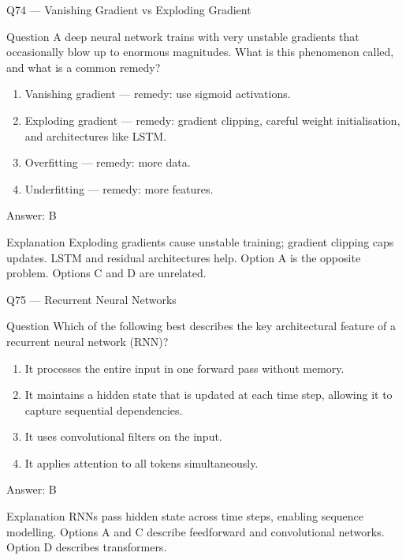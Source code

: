 \documentclass[aspectratio=169,8pt]{beamer}
\begin{document}
	\begin{frame}{Q74 --- Vanishing Gradient vs Exploding Gradient}
		\begin{block}{Question}
			A deep neural network trains with very unstable gradients that occasionally blow up to enormous magnitudes. What is this phenomenon called, and what is a common remedy?
		\end{block}
		\begin{enumerate}
			\item Vanishing gradient --- remedy: use sigmoid activations.
			\item Exploding gradient --- remedy: gradient clipping, careful weight initialisation, and architectures like LSTM.
			\item Overfitting --- remedy: more data.
			\item Underfitting --- remedy: more features.
		\end{enumerate}
		\begin{exampleblock}{Answer: B}\end{exampleblock}
		\begin{block}{Explanation}
			Exploding gradients cause unstable training; gradient clipping caps updates. LSTM and residual architectures help. Option A is the opposite problem. Options C and D are unrelated.
		\end{block}
	\end{frame}
	
	\begin{frame}{Q75 --- Recurrent Neural Networks}
		\begin{block}{Question}
			Which of the following best describes the key architectural feature of a recurrent neural network (RNN)?
		\end{block}
		\begin{enumerate}
			\item It processes the entire input in one forward pass without memory.
			\item It maintains a hidden state that is updated at each time step, allowing it to capture sequential dependencies.
			\item It uses convolutional filters on the input.
			\item It applies attention to all tokens simultaneously.
		\end{enumerate}
		\begin{exampleblock}{Answer: B}\end{exampleblock}
		\begin{block}{Explanation}
			RNNs pass hidden state across time steps, enabling sequence modelling. Options A and C describe feedforward and convolutional networks. Option D describes transformers.
		\end{block}
	\end{frame}
	
\end{document}
